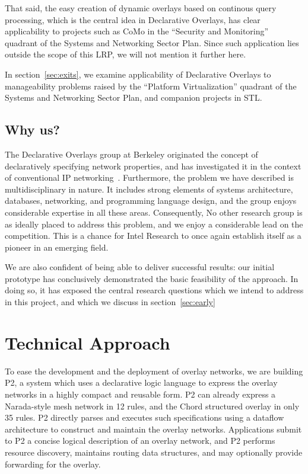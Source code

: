 \documentclass[twocolumn,10pt]{article}
\def\Sys{P2\xspace}
\def\Lrp{Declarative Overlays\xspace}
\begin{document}
That said, the easy creation of dynamic overlays based on continous
query processing, which is the central idea in \Lrp, has clear
applicability to projects such as CoMo in the ``Security and
Monitoring'' quadrant of the Systems and Networking Sector Plan.
Since such application lies outside the scope of this LRP, we will not
mention it further here.  

In section~\ref{sec:exits}, we examine applicability of \Lrp to
manageability problems raised by the ``Platform Virtualization''
quadrant of the Systems and Networking Sector Plan, and companion
projects in STL. 

\subsection{Why us?}

The \Lrp group at Berkeley originated the concept of declaratively
specifying network properties, and has investigated it in the context
of conventional IP networking~\cite{loo-hotnets04,loo-sigcomm05}. 
Furthermore, the problem we have described is multidisciplinary in
nature.  It includes strong elements of systems architecture,
databases, networking, and programming language design, and the group
enjoys considerable expertise in all these areas.  Consequently, 
No other research group is as ideally placed to address this problem,
and we enjoy a considerable lead on the competition.  This is a chance
for Intel Research to once again establish itself as a pioneer in an
emerging field. 

We are also confident of being able to deliver successful results: our
initial prototype has conclusively demonstrated the basic
feasibility of the approach.  In doing so, it has exposed the central
research questions which we intend to address in this project, and
which we discuss in section~\ref{sec:early}

\section{Technical Approach}
\label{sec:approach}

To ease the development and the deployment of overlay networks,
we are building \Sys, a system which uses a declarative logic
language to express the overlay networks in a highly compact and
reusable form. \Sys can already express a Narada-style mesh network in
12 rules, and the Chord structured overlay in only 35 rules.  \Sys
directly parses and executes such specifications using a dataflow
architecture to construct and maintain the overlay networks. 
Applications submit to \Sys a concise logical
description of an overlay network, and \Sys performs resource
discovery, maintains routing data structures, and may optionally
provide forwarding for the overlay.
\end{document}
